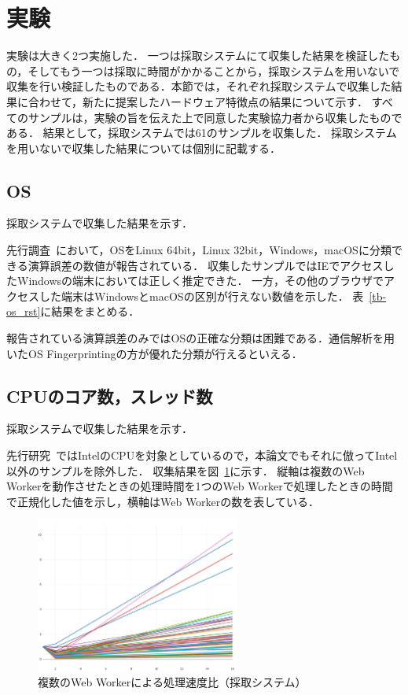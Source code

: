 \newpage
\section{実験}
実験は大きく2つ実施した．
一つは採取システムにて収集した結果を検証したもの，そしてもう一つは採取に時間がかかることから，採取システムを用いないで収集を行い検証したものである．本節では，それぞれ採取システムで収集した結果に合わせて，新たに提案したハードウェア特徴点の結果について示す．
すべてのサンプルは，実験の旨を伝えた上で同意した実験協力者から収集したものである．
結果として，採取システムでは61のサンプルを収集した．
採取システムを用いないで収集した結果については個別に記載する．

\subsection{OS}
採取システムで収集した結果を示す．

先行調査~\cite{tor_mathtan}において，OSをLinux 64bit，Linux 32bit，Windows，macOSに分類できる演算誤差の数値が報告されている．
収集したサンプルではIEでアクセスしたWindowsの端末においては正しく推定できた．
一方，その他のブラウザでアクセスした端末はWindowsとmacOSの区別が行えない数値を示した．
表~\ref{tb-os_rst}に結果をまとめる．



報告されている演算誤差のみではOSの正確な分類は困難である．通信解析を用いたOS Fingerprintingの方が優れた分類が行えるといえる．

\subsection{CPUのコア数，スレッド数}
採取システムで収集した結果を示す．

先行研究~\cite{後藤浩行2013web,桐生直輝2014web}ではIntelのCPUを対象としているので，本論文でもそれに倣ってIntel以外のサンプルを除外した．
収集結果を図~\ref{fig-cpu_rst}に示す．
縦軸は複数のWeb Workerを動作させたときの処理時間を1つのWeb Workerで処理したときの時間で正規化した値を示し，横軸はWeb Workerの数を表している．

\begin{figure}[H]
    \centering
    \includegraphics[width=0.6\textwidth,pagebox=cropbox]{fig/cpu_rst.pdf}
    \caption{複数のWeb Workerによる処理速度比（採取システム）}
    \label{fig-cpu_rst}
\end{figure}

